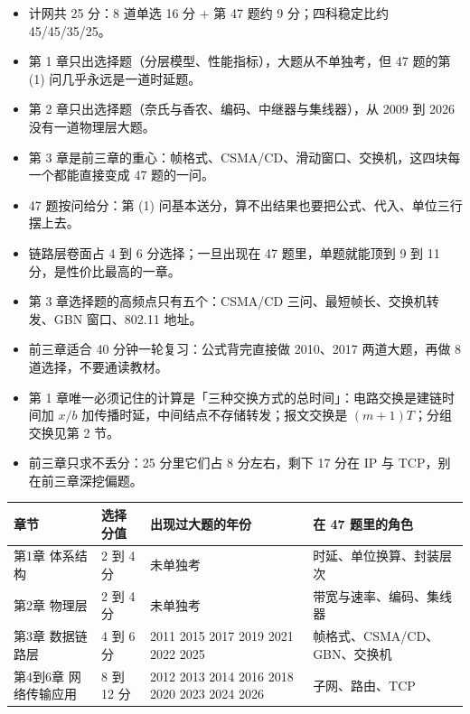 \documentclass[10pt,a4paper]{ctexart}
\begin{document}
\begin{itemize}

\item 计网共 25 分：8 道单选 16 分 + 第 47 题约 9 分；四科稳定比约 45/45/35/25。

\item 第 1 章只出选择题（分层模型、性能指标），大题从不单独考，但 47 题的第 (1) 问几乎永远是一道时延题。

\item 第 2 章只出选择题（奈氏与香农、编码、中继器与集线器），从 2009 到 2026 没有一道物理层大题。

\item 第 3 章是前三章的重心：帧格式、CSMA/CD、滑动窗口、交换机，这四块每一个都能直接变成 47 题的一问。

\item 47 题按问给分：第 (1) 问基本送分，算不出结果也要把公式、代入、单位三行摆上去。

\item 链路层卷面占 4 到 6 分选择；一旦出现在 47 题里，单题就能顶到 9 到 11 分，是性价比最高的一章。

\item 第 3 章选择题的高频点只有五个：CSMA/CD 三问、最短帧长、交换机转发、GBN 窗口、802.11 地址。

\item 前三章适合 40 分钟一轮复习：公式背完直接做 2010、2017 两道大题，再做 8 道选择，不要通读教材。

\item 第 1 章唯一必须记住的计算是「三种交换方式的总时间」：电路交换是建链时间加 $x/b$ 加传播时延，中间结点不存储转发；报文交换是 $(m+1)T$；分组交换见第 2 节。

\item 前三章只求不丢分：25 分里它们占 8 分左右，剩下 17 分在 IP 与 TCP，别在前三章深挖偏题。

\end{itemize}

\begin{center}\small
\begin{tabularx}{\linewidth}{@{}>{\raggedright\arraybackslash}Xl>{\raggedright\arraybackslash}X>{\raggedright\arraybackslash}X@{}}
\toprule
章节 & 选择分值 & 出现过大题的年份 & 在 47 题里的角色 \\
\midrule
第1章 体系结构 & 2 到 4 分 & 未单独考 & 时延、单位换算、封装层次 \\
第2章 物理层 & 2 到 4 分 & 未单独考 & 带宽与速率、编码、集线器 \\
第3章 数据链路层 & 4 到 6 分 & 2010 2011 2015 2017 2019 2021 2022 2025 & 帧格式、CSMA/CD、GBN、交换机 \\
第4到6章 网络传输应用 & 8 到 12 分 & 2009 2012 2013 2014 2016 2018 2020 2023 2024 2026 & 子网、路由、TCP \\
\bottomrule
\end{tabularx}
\end{center}
\end{document}
